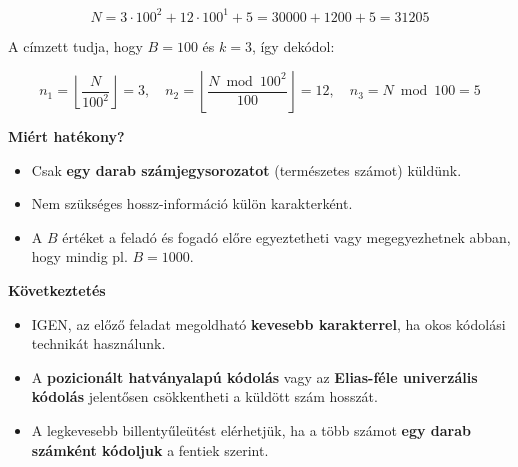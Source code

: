 \begin{solution}
\[
N=3\cdot100^{2}+12\cdot100^{1}+5=30000+1200+5=31205
\]

A címzett tudja, hogy $B=100$ és $k=3$, így dekódol:

\[
n_{1}=\left\lfloor \frac{N}{100^{2}}\right\rfloor =3,\quad n_{2}=\left\lfloor \frac{N\bmod100^{2}}{100}\right\rfloor =12,\quad n_{3}=N\bmod100=5
\]


\textbf{Miért hatékony?}\\
\begin{itemize}
\item Csak \textbf{egy darab számjegysorozatot} (természetes számot) küldünk. 
\item Nem szükséges hossz-információ külön karakterként. 
\item A $B$ értéket a feladó és fogadó előre egyeztetheti vagy megegyezhetnek
abban, hogy mindig pl. $B=1000$. 
\end{itemize}

\textbf{Következtetés}\\
\begin{itemize}
\item IGEN, az előző feladat megoldható \textbf{kevesebb karakterrel}, ha
okos kódolási technikát használunk. 
\item A \textbf{pozicionált hatványalapú kódolás} vagy az \textbf{Elias-féle
univerzális kódolás} jelentősen csökkentheti a küldött szám hosszát. 
\item A legkevesebb billentyűleütést elérhetjük, ha a több számot \textbf{egy
darab számként kódoljuk} a fentiek szerint. 
\end{itemize}
\end{solution}


